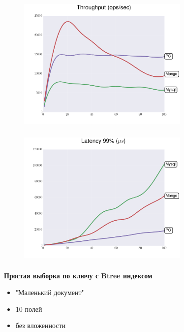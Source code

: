 \documentclass[18pt, compress, aspectratio=169]{beamer}
\begin{document}
\begin{frame}
    \frametitle{}
    \begin{center}
    \begin{figure}
        \includegraphics[width=0.75\textwidth,center]{benchmarks/workload_c_jsonb_path_ops/throughput.png}
    \end{figure}
    \end{center}
\end{frame}

\begin{frame}
    \frametitle{}
    \begin{center}
    \begin{figure}
        \includegraphics[width=0.75\textwidth,center]{benchmarks/workload_c_jsonb_path_ops/latency_99.png}
    \end{figure}
    \end{center}
\end{frame}

\begin{frame}
    \frametitle{}
    \begin{center}
        \textbf{Простая выборка по ключу с Btree индексом}
        \begin{itemize}[label={}]
            \item "Маленький документ"
            \item 10 полей
            \item без вложенности
        \end{itemize}
    \end{center}
\end{frame}
\end{document}
